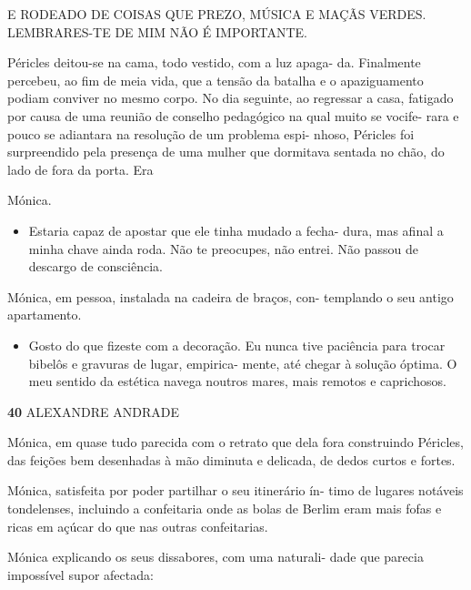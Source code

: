 E RODEADO DE COISAS QUE PREZO, MÚSICA E MAÇÃS VERDES. LEMBRARES-TE DE
MIM NÃO É IMPORTANTE.

Péricles deitou-se na cama, todo vestido, com a luz apaga- da.
Finalmente percebeu, ao fim de meia vida, que a tensão da batalha e o
apaziguamento podiam conviver no mesmo corpo. No dia seguinte, ao
regressar a casa, fatigado por causa de uma reunião de conselho
pedagógico na qual muito se vocife- rara e pouco se adiantara na
resolução de um problema espi- nhoso, Péricles foi surpreendido pela
presença de uma mulher que dormitava sentada no chão, do lado de fora da
porta. Era

Mónica.

\begin{itemize}
\tightlist
\item
  Estaria capaz de apostar que ele tinha mudado a fecha- dura, mas
  afinal a minha chave ainda roda. Não te preocupes, não entrei. Não
  passou de descargo de consciência.
\end{itemize}

Mónica, em pessoa, instalada na cadeira de braços, con- templando o seu
antigo apartamento.

\begin{itemize}
\tightlist
\item
  Gosto do que fizeste com a decoração. Eu nunca tive paciência para
  trocar bibelôs e gravuras de lugar, empirica- mente, até chegar à
  solução óptima. O meu sentido da estética navega noutros mares, mais
  remotos e caprichosos.
\end{itemize}

\textbf{40 }ALEXANDRE ANDRADE

Mónica, em quase tudo parecida com o retrato que dela fora construindo
Péricles, das feições bem desenhadas à mão diminuta e delicada, de dedos
curtos e fortes.

Mónica, satisfeita por poder partilhar o seu itinerário ín- timo de
lugares notáveis tondelenses, incluindo a confeitaria onde as bolas de
Berlim eram mais fofas e ricas em açúcar do que nas outras confeitarias.

Mónica explicando os seus dissabores, com uma naturali- dade que parecia
impossível supor afectada:

